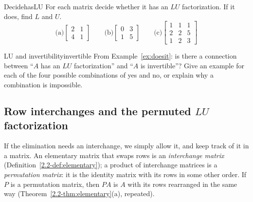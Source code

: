 \documentclass[11pt]{article}
\begin{document}
\begin{kc}{Decide}{hasLU}
For each matrix decide whether it has an $LU$ factorization. If it does, find $L$ and $U$.
\[
\text{(a)}\begin{bmatrix}2&1\\4&1\end{bmatrix}\qquad
\text{(b)}\begin{bmatrix}0&3\\1&5\end{bmatrix}\qquad
\text{(c)}\begin{bmatrix}1&1&1\\2&2&5\\1&2&3\end{bmatrix}
\]
\end{kc}

\begin{think}{LU and invertibility}{invertible}
From Example~\ref{ex:doesit}: is there a connection between ``$A$ has an $LU$ factorization'' and ``$A$ is invertible''? Give an example for each of the four possible combinations of yes and no, or explain why a combination is impossible.
\end{think}

\subsection*{Row interchanges and the permuted $LU$ factorization}

If the elimination needs an interchange, we simply allow it, and keep track of it in a matrix. An elementary matrix that swaps rows is an \emph{interchange matrix} (Definition~\ref{2.2-def:elementary}); a product of interchange matrices is a \emph{permutation matrix}: it is the identity matrix with its rows in some other order. If $P$ is a permutation matrix, then $PA$ is $A$ with its rows rearranged in the same way (Theorem~\ref{2.2-thm:elementary}(a), repeated).
\end{document}
